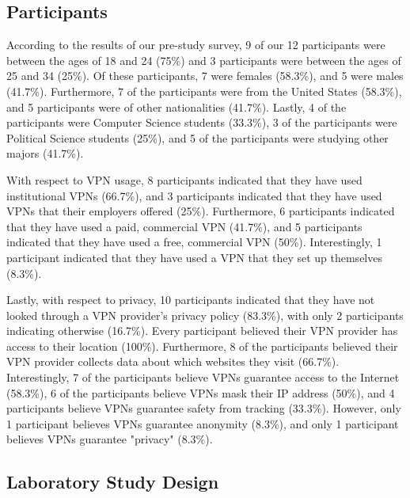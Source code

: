\subsection{Participants} 
According to the results of our pre-study survey, 9 of our 12 participants were between the ages of 18 and 24 (75\%) and 3 participants were between the ages of 25 and 34 (25\%).
Of these participants, 7 were females (58.3\%), and 5 were males (41.7\%).
Furthermore, 7 of the participants were from the United States (58.3\%), and 5 participants were of other nationalities (41.7\%). 
Lastly, 4 of the participants were Computer Science students (33.3\%), 3 of the participants were Political Science students (25\%), and 5 of the participants were studying other majors (41.7\%).

With respect to VPN usage, 8 participants indicated that they have used institutional VPNs (66.7\%), and 3 participants indicated that they have used VPNs that their employers offered (25\%).
Furthermore, 6 participants indicated that they have used a paid, commercial VPN (41.7\%), and 5 participants indicated that they have used a free, commercial VPN (50\%).
Interestingly, 1 participant indicated that they have used a VPN that they set up themselves (8.3\%).

Lastly, with respect to privacy, 10 participants indicated that they have not looked through a VPN provider's privacy policy (83.3\%), with only 2 participants indicating otherwise (16.7\%).
Every participant believed their VPN provider has access to their location (100\%).
Furthermore, 8 of the participants believed their VPN provider collects data about which websites they visit (66.7\%).
Interestingly, 7 of the participants believe VPNs guarantee access to the Internet (58.3\%), 6 of the participants believe VPNs mask their IP address (50\%), and 4 participants believe VPNs guarantee safety from tracking (33.3\%).
However, only 1 participant believes VPNs guarantee anonymity (8.3\%), and only 1 participant believes VPNs guarantee "privacy" (8.3\%).
 
\subsection{Laboratory Study Design}
